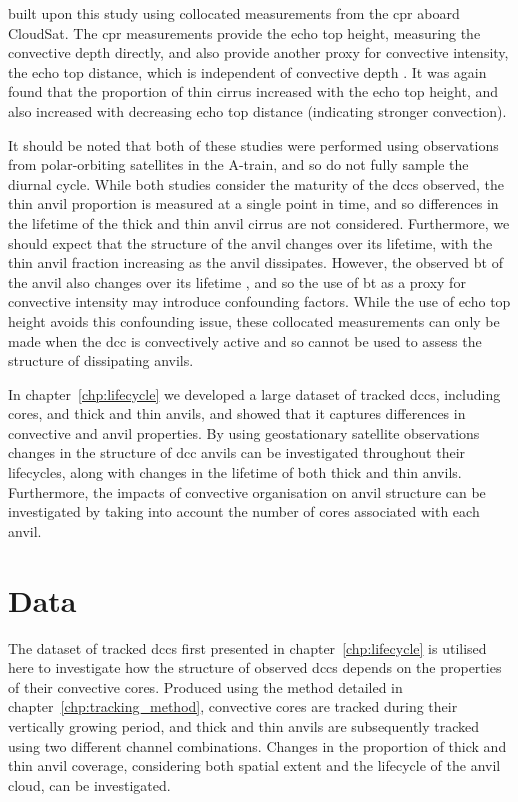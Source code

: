 \citet{takahashi_relationships_2017} built upon this study using collocated measurements from the \acrfull{cpr} aboard CloudSat.
The \acrshort{cpr} measurements provide the echo top height, measuring the convective depth directly, and also provide another proxy for convective intensity, the echo top distance, which is independent of convective depth \citep{takahashi_characterizing_2014}.
It was again found that the proportion of thin cirrus increased with the echo top height, and also increased with decreasing echo top distance (indicating stronger convection).

It should be noted that both of these studies were performed using observations from polar-orbiting satellites in the A-train, and so do not fully sample the diurnal cycle.
While both studies consider the maturity of the \acrshort{dcc}s observed, the thin anvil proportion is measured at a single point in time, and so differences in the lifetime of the thick and thin anvil cirrus are not considered.
Furthermore, we should expect that the structure of the anvil changes over its lifetime, with the thin anvil fraction increasing as the anvil dissipates.
However, the observed \acrshort{bt} of the anvil also changes over its lifetime \citep{futyan_deep_2007}, and so the use of \acrshort{bt} as a proxy for convective intensity may introduce confounding factors.
While the use of echo top height avoids this confounding issue, these collocated measurements can only be made when the \acrfull{dcc} is convectively active and so cannot be used to assess the structure of dissipating anvils.

In chapter~\ref{chp:lifecycle} we developed a large dataset of tracked \acrshort{dcc}s, including cores, and thick and thin anvils, and showed that it captures differences in convective and anvil properties.
By using geostationary satellite observations changes in the structure of \acrshort{dcc} anvils can be investigated throughout their lifecycles, along with changes in the lifetime of both thick and thin anvils.
Furthermore, the impacts of convective organisation on anvil structure can be investigated by taking into account the number of cores associated with each anvil.


\section{Data}

The dataset of tracked \acrshort{dcc}s first presented in chapter~\ref{chp:lifecycle} is utilised here to investigate how the structure of observed \acrshort{dcc}s depends on the properties of their convective cores.
Produced using the method detailed in chapter~\ref{chp:tracking_method}, convective cores are tracked during their vertically growing period, and thick and thin anvils are subsequently tracked using two different channel combinations.
Changes in the proportion of thick and thin anvil coverage, considering both spatial extent and the lifecycle of the anvil cloud, can be investigated.


